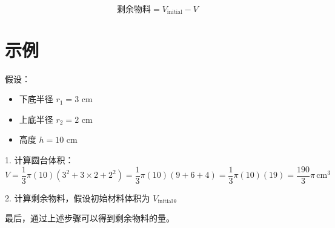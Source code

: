 \documentclass{article}
\begin{document}
\[
\text{剩余物料} = V_{\text{initial}} - V
\]

\section{示例}

假设：
\begin{itemize}
    \item 下底半径 \( r_1 = 3 \) cm
    \item 上底半径 \( r_2 = 2 \) cm
    \item 高度 \( h = 10 \) cm
\end{itemize}

1. 计算圆台体积：
\[
V = \frac{1}{3} \pi (10) (3^2 + 3 \times 2 + 2^2) = \frac{1}{3} \pi (10) (9 + 6 + 4) = \frac{1}{3} \pi (10) (19) = \frac{190}{3} \pi \, \text{cm}^3
\]

2. 计算剩余物料，假设初始材料体积为 \( V_{\text{initial}} \)。

最后，通过上述步骤可以得到剩余物料的量。
\end{document}
